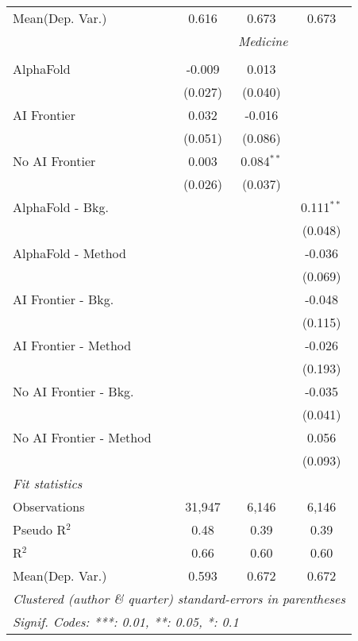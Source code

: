 \begin{tabular}{lccc}
Mean(Dep. Var.) & 0.616 & 0.673 & 0.673 \\
 & \multicolumn{3}{c}{\textit{Medicine}} \\ \\
   AlphaFold               & -0.009  & 0.013        &   \\   
                           & (0.027) & (0.040)      &   \\   
   AI Frontier             & 0.032   & -0.016       &   \\   
                           & (0.051) & (0.086)      &   \\   
   No AI Frontier          & 0.003   & 0.084$^{**}$ &   \\   
                           & (0.026) & (0.037)      &   \\   
   AlphaFold - Bkg.        &         &              & 0.111$^{**}$\\   
                           &         &              & (0.048)\\   
   AlphaFold - Method      &         &              & -0.036\\   
                           &         &              & (0.069)\\   
   AI Frontier - Bkg.      &         &              & -0.048\\   
                           &         &              & (0.115)\\   
   AI Frontier - Method    &         &              & -0.026\\   
                           &         &              & (0.193)\\   
   No AI Frontier - Bkg.   &         &              & -0.035\\   
                           &         &              & (0.041)\\   
   No AI Frontier - Method &         &              & 0.056\\   
                           &         &              & (0.093)\\   
   \midrule
   \emph{Fit statistics}\\
   Observations            & 31,947  & 6,146        & 6,146\\  
   Pseudo R$^2$            & 0.48    & 0.39         & 0.39\\  
   R$^2$                   & 0.66    & 0.60         & 0.60\\  
Mean(Dep. Var.) & 0.593 & 0.672 & 0.672 \\
   \midrule \midrule
   \multicolumn{4}{l}{\emph{Clustered (author \& quarter) standard-errors in parentheses}}\\
   \multicolumn{4}{l}{\emph{Signif. Codes: ***: 0.01, **: 0.05, *: 0.1}}\\
\end{tabular}
\par\endgroup
